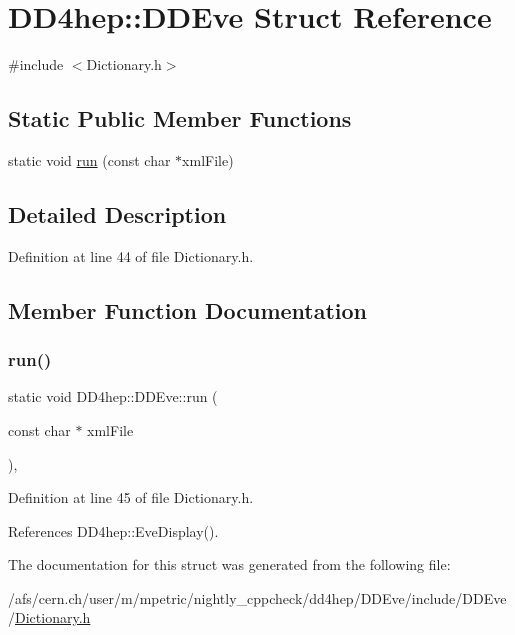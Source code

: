 \hypertarget{struct_d_d4hep_1_1_d_d_eve}{}\section{D\+D4hep\+:\+:D\+D\+Eve Struct Reference}
\label{struct_d_d4hep_1_1_d_d_eve}


{\ttfamily \#include $<$Dictionary.\+h$>$}

\subsection*{Static Public Member Functions}
\begin{DoxyCompactItemize}
\item 
static void \hyperlink{struct_d_d4hep_1_1_d_d_eve_a61d03aa1851244f5429fc1c09b0e0053}{run} (const char $\ast$xml\+File)
\end{DoxyCompactItemize}


\subsection{Detailed Description}


Definition at line 44 of file Dictionary.\+h.



\subsection{Member Function Documentation}
\hypertarget{struct_d_d4hep_1_1_d_d_eve_a61d03aa1851244f5429fc1c09b0e0053}{}\label{struct_d_d4hep_1_1_d_d_eve_a61d03aa1851244f5429fc1c09b0e0053} 
\subsubsection{\texorpdfstring{run()}{run()}}
{\footnotesize\ttfamily static void D\+D4hep\+::\+D\+D\+Eve\+::run (\begin{DoxyParamCaption}\item[{const char $\ast$}]{xml\+File }\end{DoxyParamCaption})\hspace{0.3cm}{\ttfamily [inline]}, {\ttfamily [static]}}



Definition at line 45 of file Dictionary.\+h.



References D\+D4hep\+::\+Eve\+Display().



The documentation for this struct was generated from the following file\+:\begin{DoxyCompactItemize}
\item 
/afs/cern.\+ch/user/m/mpetric/nightly\+\_\+cppcheck/dd4hep/\+D\+D\+Eve/include/\+D\+D\+Eve/\hyperlink{_d_d_eve_2include_2_d_d_eve_2_dictionary_8h}{Dictionary.\+h}\end{DoxyCompactItemize}
